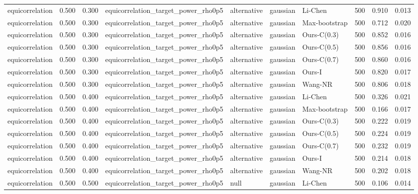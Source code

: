 \begin{tabular}{lrrllllrrr}
equicorrelation & 0.500 & 0.300 & equicorrelation\_target\_power\_rho0p5 & alternative & gaussian & Li-Chen & 500 & 0.910 & 0.013 \\
equicorrelation & 0.500 & 0.300 & equicorrelation\_target\_power\_rho0p5 & alternative & gaussian & Max-bootstrap & 500 & 0.712 & 0.020 \\
equicorrelation & 0.500 & 0.300 & equicorrelation\_target\_power\_rho0p5 & alternative & gaussian & Ours-C(0.3) & 500 & 0.852 & 0.016 \\
equicorrelation & 0.500 & 0.300 & equicorrelation\_target\_power\_rho0p5 & alternative & gaussian & Ours-C(0.5) & 500 & 0.856 & 0.016 \\
equicorrelation & 0.500 & 0.300 & equicorrelation\_target\_power\_rho0p5 & alternative & gaussian & Ours-C(0.7) & 500 & 0.860 & 0.016 \\
equicorrelation & 0.500 & 0.300 & equicorrelation\_target\_power\_rho0p5 & alternative & gaussian & Ours-I & 500 & 0.820 & 0.017 \\
equicorrelation & 0.500 & 0.300 & equicorrelation\_target\_power\_rho0p5 & alternative & gaussian & Wang-NR & 500 & 0.806 & 0.018 \\
equicorrelation & 0.500 & 0.400 & equicorrelation\_target\_power\_rho0p5 & alternative & gaussian & Li-Chen & 500 & 0.326 & 0.021 \\
equicorrelation & 0.500 & 0.400 & equicorrelation\_target\_power\_rho0p5 & alternative & gaussian & Max-bootstrap & 500 & 0.166 & 0.017 \\
equicorrelation & 0.500 & 0.400 & equicorrelation\_target\_power\_rho0p5 & alternative & gaussian & Ours-C(0.3) & 500 & 0.222 & 0.019 \\
equicorrelation & 0.500 & 0.400 & equicorrelation\_target\_power\_rho0p5 & alternative & gaussian & Ours-C(0.5) & 500 & 0.224 & 0.019 \\
equicorrelation & 0.500 & 0.400 & equicorrelation\_target\_power\_rho0p5 & alternative & gaussian & Ours-C(0.7) & 500 & 0.232 & 0.019 \\
equicorrelation & 0.500 & 0.400 & equicorrelation\_target\_power\_rho0p5 & alternative & gaussian & Ours-I & 500 & 0.214 & 0.018 \\
equicorrelation & 0.500 & 0.400 & equicorrelation\_target\_power\_rho0p5 & alternative & gaussian & Wang-NR & 500 & 0.202 & 0.018 \\
equicorrelation & 0.500 & 0.500 & equicorrelation\_target\_power\_rho0p5 & null & gaussian & Li-Chen & 500 & 0.106 & 0.014 \\

\end{tabular}
